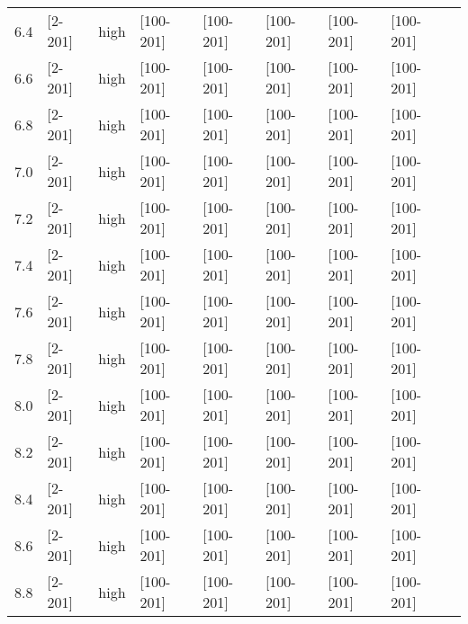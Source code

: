 \documentclass{article}
\begin{document}
\begin{tabular}{| l | l | l | l | l | l | l | l | l |}
      6.4 & [2-201] & high & [100-201] & [100-201] & [100-201] & [100-201] & [100-201] &\\
      6.6 & [2-201] & high & [100-201] & [100-201] & [100-201] & [100-201] & [100-201] &\\
      6.8 & [2-201] & high & [100-201] & [100-201] & [100-201] & [100-201] & [100-201] &\\
      7.0 & [2-201] & high & [100-201] & [100-201] & [100-201] & [100-201] & [100-201] &\\
      7.2 & [2-201] & high & [100-201] & [100-201] & [100-201] & [100-201] & [100-201] &\\
      7.4 & [2-201] & high & [100-201] & [100-201] & [100-201] & [100-201] & [100-201] &\\
      7.6 & [2-201] & high & [100-201] & [100-201] & [100-201] & [100-201] & [100-201] &\\
      7.8 & [2-201] & high & [100-201] & [100-201] & [100-201] & [100-201] & [100-201] &\\
      8.0 & [2-201] & high & [100-201] & [100-201] & [100-201] & [100-201] & [100-201] &\\
      8.2 & [2-201] & high & [100-201] & [100-201] & [100-201] & [100-201] & [100-201] &\\
      8.4 & [2-201] & high & [100-201] & [100-201] & [100-201] & [100-201] & [100-201] &\\
      8.6 & [2-201] & high & [100-201] & [100-201] & [100-201] & [100-201] & [100-201] &\\
      8.8 & [2-201] & high & [100-201] & [100-201] & [100-201] & [100-201] & [100-201] &\\
      \hline
    \end{tabular}
\end{document}
